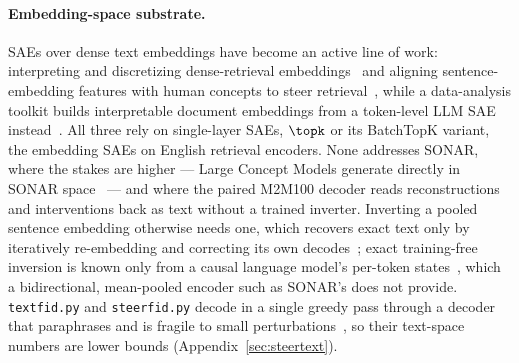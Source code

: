 \paragraph{Embedding-space substrate.}
SAEs over dense text embeddings have become an active line of work:
interpreting and discretizing dense-retrieval
embeddings~\cite{park2025decodingdenseembeddingssparse} and aligning
sentence-embedding features with human concepts to steer
retrieval~\cite{shin2026aligningsentenceembeddingshuman}, while a
data-analysis toolkit builds interpretable document embeddings from a
token-level LLM SAE instead~\cite{jiang2026interpretableembeddingssparseautoencoders}.
All three rely on single-layer SAEs, $\topk$ or its BatchTopK variant, the
embedding SAEs on English retrieval encoders. None addresses SONAR, where
the stakes are higher --- Large Concept Models generate directly in SONAR
space~\cite{lcmteam2024largeconceptmodelslanguage} --- and where the paired
M2M100 decoder reads reconstructions and interventions back as text
without a trained inverter. Inverting a pooled sentence embedding
otherwise needs one, which recovers exact text only by iteratively
re-embedding and correcting its own
decodes~\cite{morris2023textembeddingsrevealalmost}; exact training-free
inversion is known only from a causal language model's per-token
states~\cite{nikolaou2025}, which a bidirectional, mean-pooled encoder
such as SONAR's does not provide. \texttt{textfid.py} and
\texttt{steerfid.py} decode in a single greedy pass through a decoder that
paraphrases and is fragile to small
perturbations~\cite{sonar,lcmteam2024largeconceptmodelslanguage}, so their
text-space numbers are lower bounds (Appendix~\ref{sec:steertext}).

